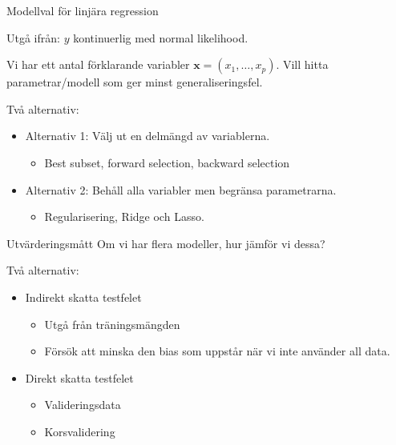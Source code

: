 \documentclass[10pt,english]{beamer}
\begin{document}

\begin{frame}{Modellval för linjära regression}

    Utgå ifrån: $y$ kontinuerlig med normal likelihood.

    Vi har ett antal förklarande variabler $\mathbf{x} = (x_1, \ldots, x_p)$. Vill hitta parametrar/modell som ger minst generaliseringsfel.

    Två alternativ:
    \begin{itemize}
        \item Alternativ 1: Välj ut en delmängd av variablerna.
        \begin{itemize}
            \item Best subset, forward selection, backward selection
        \end{itemize}
        \item Alternativ 2: Behåll alla variabler men begränsa parametrarna.
        \begin{itemize}
            \item Regularisering, Ridge och Lasso.
        \end{itemize}  
    \end{itemize}
    
\end{frame}

\begin{frame}{Utvärderingsmått}
    Om vi har flera modeller, hur jämför vi dessa?

    Två alternativ:
    \begin{itemize}
        \item Indirekt skatta testfelet
        \begin{itemize}
            \item Utgå från träningsmängden
            \item Försök att minska den bias som uppstår när vi inte använder all data.
        \end{itemize}
        \item Direkt skatta testfelet
        \begin{itemize}
            \item Valideringsdata
            \item Korsvalidering
        \end{itemize}
    \end{itemize}
\end{frame}
\end{document}
